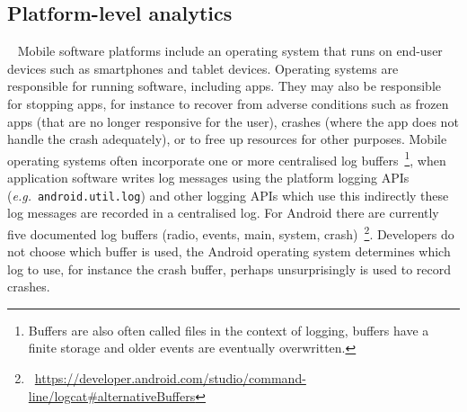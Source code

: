 \subsection{Platform-level analytics}~\label{sec:platform-level-analytics}
Mobile software platforms include an operating system that runs on end-user devices such as smartphones and tablet devices. Operating systems are responsible for running software, including apps. They may also be responsible for stopping apps, for instance to recover from adverse conditions such as frozen apps (that are no longer responsive for the user), crashes (where the app does not handle the crash adequately), or to free up resources for other purposes. Mobile operating systems often incorporate one or more centralised log buffers~\footnote{Buffers are also often called files in the context of logging, buffers have a finite storage and older events are eventually overwritten.}, when application software writes log messages %
using the platform logging APIs (\emph{e.g.}~\texttt{android.util.log}) and other logging APIs which use this indirectly these log messages are recorded in a centralised log. For Android there are currently five documented log buffers (radio, events, main, system, crash)~\footnote{~\url{https://developer.android.com/studio/command-line/logcat\#alternativeBuffers}}. Developers do not choose which buffer is used, the Android operating system determines which log to use, for instance the crash buffer, perhaps unsurprisingly is used to record crashes.

